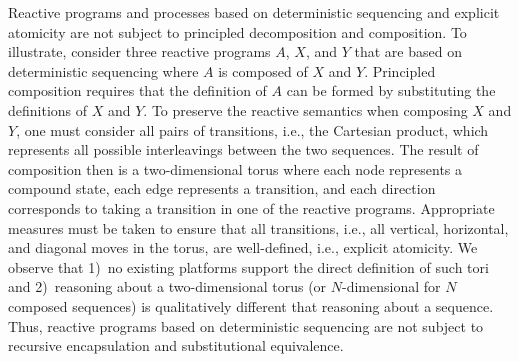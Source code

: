 Reactive programs and processes based on deterministic sequencing and explicit atomicity are not subject to principled decomposition and composition.
To illustrate, consider three reactive programs $A$, $X$, and $Y$ that are based on deterministic sequencing where $A$ is composed of $X$ and $Y$.
Principled composition requires that the definition of $A$ can be formed by substituting the definitions of $X$ and $Y$.
To preserve the reactive semantics when composing $X$ and $Y$, one must consider all pairs of transitions, i.e., the Cartesian product, which represents all possible interleavings between the two sequences.
The result of composition then is a two-dimensional torus where each node represents a compound state, each edge represents a transition, and each direction corresponds to taking a transition in one of the reactive programs.
Appropriate measures must be taken to ensure that all transitions, i.e., all vertical, horizontal, and diagonal moves in the torus, are well-defined, i.e., explicit atomicity.
We observe that 1)~no existing platforms support the direct definition of such tori and 2)~reasoning about a two-dimensional torus (or $N$-dimensional for $N$ composed sequences) is qualitatively different that reasoning about a sequence.
Thus, reactive programs based on deterministic sequencing are not subject to recursive encapsulation and substitutional equivalence.



